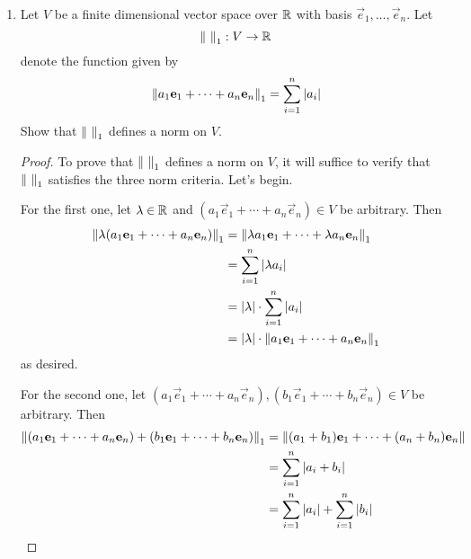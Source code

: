 \documentclass[../psets.tex]{subfiles}
\begin{document}
\begin{enumerate}
\begin{enumerate}
\begin{proof}
            \begin{equation*}
                \norm{\vec{v}-\vec{w}}_1 \leq C_2\norm{\vec{v}-\vec{w}}_2
                < C_2\epsilon
                = \epsilon'
            \end{equation*}
            This implies that $\vec{w}\in U$, as desired.\par
            The proof is symmetric in the reverse direction.
        \end{proof}
        \item Let $V$ be a finite dimensional vector space over $\mathbb{R}$ with basis $\vec{e}_1,\dots,\vec{e}_n$. Let
        \begin{equation*}
            \norm{\ }_1:V\to\mathbb{R}
        \end{equation*}
        denote the function given by
        \begin{equation*}
            \norm{a_1\mathbf{e}_1+\cdots+a_n\mathbf{e}_n}_1 = \sum_{i=1}^n|a_i|
        \end{equation*}
        Show that $\norm{\ }_1$ defines a norm on $V$.
        \begin{proof}
            To prove that $\norm{\ }_1$ defines a norm on $V$, it will suffice to verify that $\norm{\ }_1$ satisfies the three norm criteria. Let's begin.\par\smallskip
            For the first one, let $\lambda\in\mathbb{R}$ and $(a_1\vec{e}_1+\cdots+a_n\vec{e}_n)\in V$ be arbitrary. Then
            \begin{align*}
                \norm{\lambda(a_1\mathbf{e}_1+\cdots+a_n\mathbf{e}_n)}_1 &= \norm{\lambda a_1\mathbf{e}_1+\cdots+\lambda a_n\mathbf{e}_n}_1\\
                &= \sum_{i=1}^n|\lambda a_i|\\
                &= |\lambda|\cdot\sum_{i=1}^n|a_i|\\
                &= |\lambda|\cdot\norm{a_1\mathbf{e}_1+\cdots+a_n\mathbf{e}_n}_1
            \end{align*}
            as desired.\par
            For the second one, let $(a_1\vec{e}_1+\cdots+a_n\vec{e}_n),(b_1\vec{e}_1+\cdots+b_n\vec{e}_n)\in V$ be arbitrary. Then
            \begin{align*}
                \norm{(a_1\vec{e}_1+\cdots+a_n\vec{e}_n)+(b_1\vec{e}_1+\cdots+b_n\vec{e}_n)}_1 &= \norm{(a_1+b_1)\vec{e}_1+\cdots+(a_n+b_n)\vec{e}_n}\\
                &= \sum_{i=1}^n|a_i+b_i|\\
                &= \sum_{i=1}^n|a_i|+\sum_{i=1}^n|b_i|\\

\end{align*}
\end{proof}
\end{enumerate}
\end{enumerate}
\end{document}

